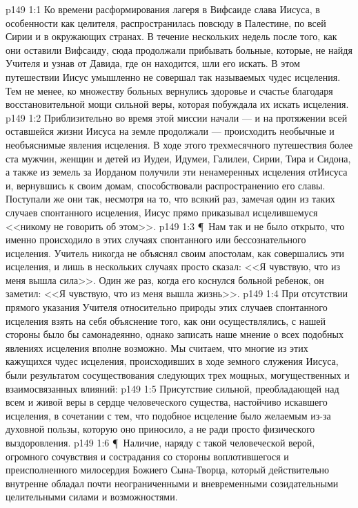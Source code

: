 \vs p149 1:1 Ко времени расформирования лагеря в Вифсаиде слава Иисуса, в особенности как целителя, распространилась повсюду в Палестине, по всей Сирии и в окружающих странах. В течение нескольких недель после того, как они оставили Вифсаиду, сюда продолжали прибывать больные, которые, не найдя Учителя и узнав от Давида, где он находится, шли его искать. В этом путешествии Иисус умышленно не совершал так называемых чудес исцеления. Тем не менее, ко множеству больных вернулись здоровье и счастье благодаря восстановительной мощи сильной веры, которая побуждала их искать исцеления.
\vs p149 1:2 Приблизительно во время этой миссии начали --- и на протяжении всей оставшейся жизни Иисуса на земле продолжали --- происходить необычные и необъяснимые явления исцеления. В ходе этого трехмесячного путешествия более ста мужчин, женщин и детей из Иудеи, Идумеи, Галилеи, Сирии, Тира и Сидона, а также из земель за Иорданом получили эти ненамеренных исцеления отИисуса и, вернувшись к своим домам, способствовали распространению его славы. Поступали же они так, несмотря на то, что всякий раз, замечая один из таких случаев спонтанного исцеления, Иисус прямо приказывал исцелившемуся <<никому не говорить об этом>>.
\vs p149 1:3 \P\ Нам так и не было открыто, что именно происходило в этих случаях спонтанного или бессознательного исцеления. Учитель никогда не объяснял своим апостолам, как совершались эти исцеления, и лишь в нескольких случаях просто сказал: <<Я чувствую, что из меня вышла сила>>. Один же раз, когда его коснулся больной ребенок, он заметил: <<Я чувствую, что из меня вышла жизнь>>.
\vs p149 1:4 При отсутствии прямого указания Учителя относительно природы этих случаев спонтанного исцеления взять на себя объяснение того, как они осуществлялись, с нашей стороны было бы самонадеянно, однако записать наше мнение о всех подобных явлениях исцеления вполне возможно. Мы считаем, что многие из этих кажущихся чудес исцеления, происходивших в ходе земного служения Иисуса, были результатом сосуществования следующих трех мощных, могущественных и взаимосвязанных влияний:
\vs p149 1:5 \bibnobreakspace Присутствие сильной, преобладающей над всем и живой веры в сердце человеческого существа, настойчиво искавшего исцеления, в сочетании с тем, что подобное исцеление было желаемым из\hyp{}за духовной пользы, которую оно приносило, а не ради просто физического выздоровления.
\vs p149 1:6 \P\ \bibnobreakspace Наличие, наряду с такой человеческой верой, огромного сочувствия и сострадания со стороны воплотившегося и преисполненного милосердия Божиего Сына\hyp{}Творца, который действительно внутренне обладал почти неограниченными и вневременными созидательными целительными силами и возможностями.

